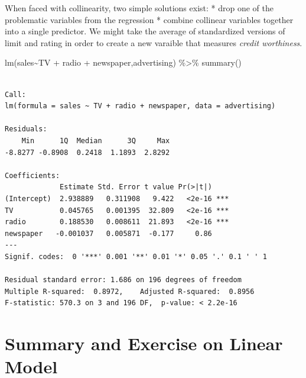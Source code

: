 \documentclass[
  letterpaper,
  DIV=11,
  numbers=noendperiod]{scrreprt}
\newenvironment{Shaded}{\begin{snugshade}}{\end{snugshade}}
\newcommand{\FunctionTok}[1]{\textcolor[rgb]{0.02,0.16,0.49}{#1}}
\newcommand{\NormalTok}[1]{\textcolor[rgb]{0.33,0.33,0.33}{#1}}
\newcommand{\SpecialCharTok}[1]{\textcolor[rgb]{0.00,0.46,0.62}{#1}}
\begin{document}
When faced with collinearity, two simple solutions exist: * drop one of
the problematic variables from the regression * combine collinear
variables together into a single predictor. We might take the average of
standardized versions of limit and rating in order to create a new
varaible that measures \emph{credit worthiness}.

\begin{Shaded}
\begin{Highlighting}[]
\FunctionTok{lm}\NormalTok{(sales}\SpecialCharTok{\textasciitilde{}}\NormalTok{TV }\SpecialCharTok{+}\NormalTok{ radio }\SpecialCharTok{+}\NormalTok{ newspaper,advertising) }\SpecialCharTok{\%\textgreater{}\%} \FunctionTok{summary}\NormalTok{()}
\end{Highlighting}
\end{Shaded}

\begin{verbatim}

Call:
lm(formula = sales ~ TV + radio + newspaper, data = advertising)

Residuals:
    Min      1Q  Median      3Q     Max 
-8.8277 -0.8908  0.2418  1.1893  2.8292 

Coefficients:
             Estimate Std. Error t value Pr(>|t|)    
(Intercept)  2.938889   0.311908   9.422   <2e-16 ***
TV           0.045765   0.001395  32.809   <2e-16 ***
radio        0.188530   0.008611  21.893   <2e-16 ***
newspaper   -0.001037   0.005871  -0.177     0.86    
---
Signif. codes:  0 '***' 0.001 '**' 0.01 '*' 0.05 '.' 0.1 ' ' 1

Residual standard error: 1.686 on 196 degrees of freedom
Multiple R-squared:  0.8972,    Adjusted R-squared:  0.8956 
F-statistic: 570.3 on 3 and 196 DF,  p-value: < 2.2e-16
\end{verbatim}


\hypertarget{summary-and-exercise-on-linear-model}{%
\chapter{Summary and Exercise on Linear
Model}\label{summary-and-exercise-on-linear-model}}
\end{document}
